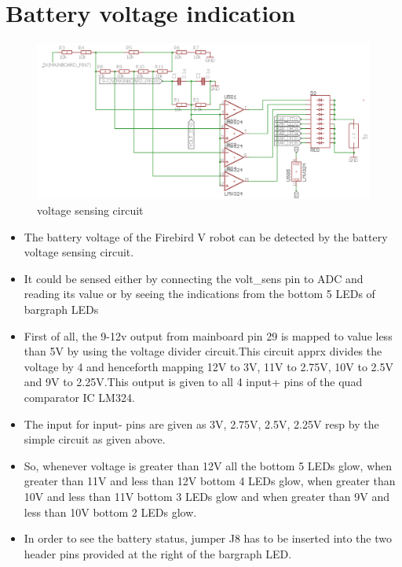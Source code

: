 \documentclass[a4paper,12pt,oneside]{book}
\begin{document}
\section{\textbf{Battery voltage indication}}

\begin{figure}[h]
	\includegraphics[width=1\textwidth]{volt_sens}
		\caption{voltage sensing circuit}
\end{figure}
\hfill
\begin{itemize}
	\item{The battery voltage of the Firebird V robot can be detected by the battery voltage sensing circuit.}
	\item{It could be sensed either by connecting the volt\_sens pin to ADC and reading its value or by seeing the indications from the bottom 5 LEDs of bargraph LEDs}
	\item{First of all, the 9-12v output from mainboard pin 29 is mapped to value less than 5V by using the voltage divider circuit.This circuit apprx divides the voltage by 4 and henceforth mapping 12V to 3V, 11V to 2.75V, 10V to 2.5V and 9V to 2.25V.This output is given to all 4 input+ pins of the quad comparator IC LM324.}
	\item{The input for input- pins are given as 3V, 2.75V, 2.5V, 2.25V resp by the simple circuit as given above.}
	\item{So, whenever voltage is greater than 12V all the bottom 5 LEDs glow, when greater than 11V and less than 12V bottom 4 LEDs glow, when greater than 10V and less than 11V bottom 3 LEDs glow and when greater than 9V and less than 10V bottom 2 LEDs glow.}
	\item {In order to see the battery status, jumper J8 has to be inserted into the two header pins provided at the right of the bargraph LED.}
\end{itemize}
\pagebreak
\end{document}
